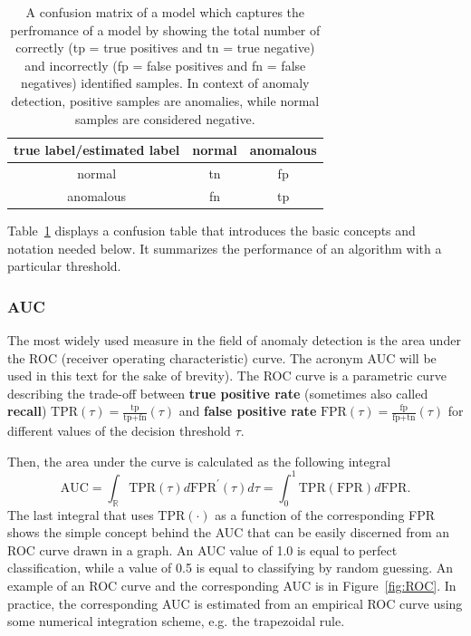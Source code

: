 \begin{table}
\centering
	\begin{tabular}{c | c c}
		true label/estimated label & normal & anomalous \\
		\hline
		normal & tn & fp  \\
		anomalous & fn & tp 
	\end{tabular}
	\caption{A confusion matrix of a model which captures the perfromance of a model by showing the total number of correctly (tp = true positives and tn = true negative) and incorrectly (fp = false positives and fn = false negatives) identified samples. In context of anomaly detection, positive samples are anomalies, while normal samples are considered negative.}
	\label{tab:conf_ex}
\end{table}
Table~\ref{tab:conf_ex} displays a confusion table that introduces the basic concepts and notation needed below. It summarizes the performance of an algorithm with a particular threshold.

\subsubsection{AUC}
The most widely used measure in the field of anomaly detection is the area under the ROC (receiver operating characteristic) curve. The acronym AUC will be used in this text for the sake of brevity). The ROC curve is a parametric curve describing the trade-off between \textbf{true positive rate} (sometimes also called \textbf{recall}) $\text{TPR}(\tau) = \frac{\text{tp}}{\text{tp+fn}}(\tau)$ and \textbf{false positive rate} $\text{FPR}(\tau) = \frac{\text{fp}}{\text{fp+tn}}(\tau)$ for different values of the decision threshold $\tau$. 

Then, the area under the curve is calculated as the following integral
\begin{equation}
\label{eq:auc}
\text{AUC}=\int_{\mathbb{R}}\text{TPR}(\tau)d\text{FPR}^{\prime}(\tau)d\tau = \int_0^1\text{TPR}(\text{FPR})d\text{FPR}.
\end{equation}
The last integral that uses $\text{TPR}(\cdot)$ as a function of the corresponding FPR shows the simple concept behind the AUC that can be easily discerned from an ROC curve drawn in a graph. An AUC value of 1.0 is equal to perfect classification, while a value of 0.5 is equal to classifying by random guessing. An example of an ROC curve and the corresponding AUC is in Figure~\ref{fig:ROC}. In practice, the corresponding AUC is estimated from an empirical ROC curve using some numerical integration scheme, e.g. the trapezoidal rule.

